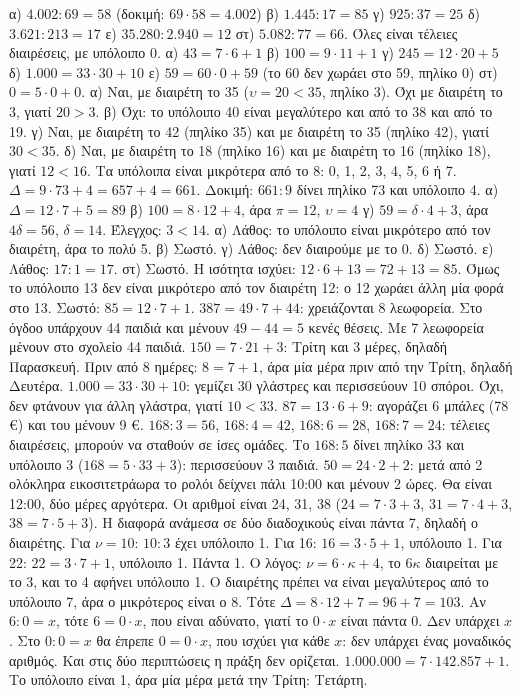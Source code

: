  α) $4.002:69=58$ (δοκιμή: $69\cdot 58=4.002$) \quad β) $1.445:17=85$ \quad γ) $925:37=25$ \quad δ) $3.621:213=17$ \quad ε) $35.280:2.940=12$ \quad στ) $5.082:77=66$. Όλες είναι τέλειες διαιρέσεις, με υπόλοιπο 0.
 α) $43=7\cdot 6+1$ \quad β) $100=9\cdot 11+1$ \quad γ) $245=12\cdot 20+5$ \quad δ) $1.000=33\cdot 30+10$ \quad ε) $59=60\cdot 0+59$ (το 60 δεν χωράει στο 59, πηλίκο 0) \quad στ) $0=5\cdot 0+0$.
 α) Ναι, με διαιρέτη το 35 ($\upsilon=20<35$, πηλίκο 3). Όχι με διαιρέτη το 3, γιατί $20>3$. β) Όχι: το υπόλοιπο 40 είναι μεγαλύτερο και από το 38 και από το 19. γ) Ναι, με διαιρέτη το 42 (πηλίκο 35) και με διαιρέτη το 35 (πηλίκο 42), γιατί $30<35$. δ) Ναι, με διαιρέτη το 18 (πηλίκο 16) και με διαιρέτη το 16 (πηλίκο 18), γιατί $12<16$.
 Τα υπόλοιπα είναι μικρότερα από το 8: 0, 1, 2, 3, 4, 5, 6 ή 7.
 $\Delta=9\cdot 73+4=657+4=661$. Δοκιμή: $661:9$ δίνει πηλίκο 73 και υπόλοιπο 4.
 α) $\Delta=12\cdot 7+5=89$ \quad β) $100=8\cdot 12+4$, άρα $\pi=12$, $\upsilon=4$ \quad γ) $59=\delta\cdot 4+3$, άρα $4\delta=56$, $\delta=14$. Έλεγχος: $3<14$.
 α) Λάθος: το υπόλοιπο είναι μικρότερο από τον διαιρέτη, άρα το πολύ 5. β) Σωστό. γ) Λάθος: δεν διαιρούμε με το 0. δ) Σωστό. ε) Λάθος: $17:1=17$. στ) Σωστό.
 Η ισότητα ισχύει: $12\cdot 6+13=72+13=85$. Όμως το υπόλοιπο 13 δεν είναι μικρότερο από τον διαιρέτη 12: ο 12 χωράει άλλη μία φορά στο 13. Σωστό: $85=12\cdot 7+1$.
 $387=49\cdot 7+44$: χρειάζονται 8 λεωφορεία. Στο όγδοο υπάρχουν 44 παιδιά και μένουν $49-44=5$ κενές θέσεις. Με 7 λεωφορεία μένουν στο σχολείο 44 παιδιά.
 $150=7\cdot 21+3$: Τρίτη και 3 μέρες, δηλαδή Παρασκευή. Πριν από 8 ημέρες: $8=7+1$, άρα μία μέρα πριν από την Τρίτη, δηλαδή Δευτέρα.
 $1.000=33\cdot 30+10$: γεμίζει 30 γλάστρες και περισσεύουν 10 σπόροι. Όχι, δεν φτάνουν για άλλη γλάστρα, γιατί $10<33$.
 $87=13\cdot 6+9$: αγοράζει 6 μπάλες (78 €) και του μένουν 9 €.
 $168:3=56$, $168:4=42$, $168:6=28$, $168:7=24$: τέλειες διαιρέσεις, μπορούν να σταθούν σε ίσες ομάδες. Το $168:5$ δίνει πηλίκο 33 και υπόλοιπο 3 ($168=5\cdot 33+3$): περισσεύουν 3 παιδιά.
 $50=24\cdot 2+2$: μετά από 2 ολόκληρα εικοσιτετράωρα το ρολόι δείχνει πάλι 10:00 και μένουν 2 ώρες. Θα είναι 12:00, δύο μέρες αργότερα.
 Οι αριθμοί είναι 24, 31, 38 ($24=7\cdot 3+3$, $31=7\cdot 4+3$, $38=7\cdot 5+3$). Η διαφορά ανάμεσα σε δύο διαδοχικούς είναι πάντα 7, δηλαδή ο διαιρέτης.
 Για $\nu=10$: $10:3$ έχει υπόλοιπο 1. Για 16: $16=3\cdot 5+1$, υπόλοιπο 1. Για 22: $22=3\cdot 7+1$, υπόλοιπο 1. Πάντα 1. Ο λόγος: $\nu=6\cdot\kappa+4$, το $6\kappa$ διαιρείται με το 3, και το 4 αφήνει υπόλοιπο 1.
 Ο διαιρέτης πρέπει να είναι μεγαλύτερος από το υπόλοιπο 7, άρα ο μικρότερος είναι ο 8. Τότε $\Delta=8\cdot 12+7=96+7=103$.
 Αν $6:0=x$, τότε $6=0\cdot x$, που είναι αδύνατο, γιατί το $0\cdot x$ είναι πάντα 0. Δεν υπάρχει $x$. Στο $0:0=x$ θα έπρεπε $0=0\cdot x$, που ισχύει για κάθε $x$: δεν υπάρχει ένας μοναδικός αριθμός. Και στις δύο περιπτώσεις η πράξη δεν ορίζεται.
 $1.000.000=7\cdot 142.857+1$. Το υπόλοιπο είναι 1, άρα μία μέρα μετά την Τρίτη: Τετάρτη.
